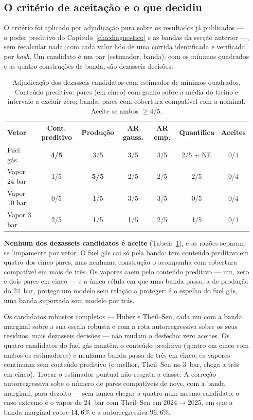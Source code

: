 \subsection{O critério de aceitação e o que decidiu}
\label{sec:demo-gate}

O critério foi aplicado por adjudicação pura sobre os resultados já
publicados --- o poder preditivo do Capítulo~\ref{cha:diagnostico} e as
bandas da secção anterior ---, sem recalcular nada, com cada valor lido de
uma corrida identificada e verificada por \emph{hash}. Um candidato é um par
(estimador, banda); com os mínimos quadrados e as quatro construções de
banda, são dezasseis decisões.

\begin{table}[htbp]
  \centering
  \caption[Critério de aceitação: candidatos de mínimos quadrados]{Adjudicação
  dos dezasseis candidatos com estimador de mínimos quadrados. Conteúdo
  preditivo: pares (em cinco) com ganho sobre a média do treino e intervalo a
  excluir zero; banda: pares com cobertura compatível com a nominal. Aceite
  se ambos $\geq 4/5$.}
  \label{tab:gate}
  \small
  \begin{tabular}{lcccccc}
    \toprule
    Vetor & Cont. preditivo & Produção & AR gauss. & AR emp. & Quantílica & Aceites \\
    \midrule
    Fuel gás     & \textbf{4/5} & 3/5 & 3/5 & 3/5 & 2/5 + NE & 0/4 \\
    Vapor 24 bar & 1/5 & \textbf{5/5} & 2/5 & 2/5 & 2/5 & 0/4 \\
    Vapor 10 bar & 0/5 & 1/5 & 3/5 & 3/5 & 0/5 & 0/4 \\
    Vapor 3 bar  & 2/5 & 1/5 & 1/5 & 2/5 & 1/5 & 0/4 \\
    \bottomrule
  \end{tabular}
\end{table}

\textbf{Nenhum dos dezasseis candidatos é aceite} (Tabela~\ref{tab:gate}), e
as razões separam-se limpamente por vetor. O fuel gás cai só pela banda:
tem conteúdo preditivo em quatro dos cinco pares, mas nenhuma construção o
acompanha com cobertura compatível em mais de três. Os vapores caem pelo
conteúdo preditivo --- um, zero e dois pares em cinco --- e a única célula
em que uma banda passa, a de produção do 24~bar, protege um modelo sem
relação a proteger: é o espelho do fuel gás, uma banda suportada sem modelo
por trás.

Os candidatos robustos completos --- Huber e Theil--Sen, cada um com a banda
marginal sobre a sua escala robusta e com a rota autorregressiva sobre os
seus resíduos, mais dezasseis decisões --- não mudam o desfecho: zero
aceites. Os quatro candidatos do fuel gás mantêm o conteúdo preditivo
(quatro em cinco com ambos os estimadores) e nenhuma banda passa de três em
cinco; os vapores continuam sem conteúdo preditivo (o melhor, Theil--Sen no
3~bar, chega a três em cinco). Trocar o estimador pontual não resgata a
classe. A correção autorregressiva sobe o número de pares compatíveis de
nove, com a banda marginal, para dezoito --- sem nunca chegar a quatro num
mesmo candidato; o caso extremo é o vapor de 24~bar com Theil--Sen em
2024${\to}$2025, em que a banda marginal cobre $14{,}6\%$ e a autorregressiva
$96{,}6\%$.


